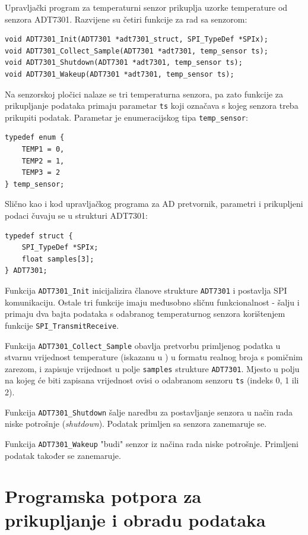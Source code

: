 Upravljački program za temperaturni senzor prikuplja uzorke temperature od senzora ADT7301. Razvijene su četiri funkcije za rad sa senzorom:

\begin{lstlisting}
void ADT7301_Init(ADT7301 *adt7301_struct, SPI_TypeDef *SPIx);
void ADT7301_Collect_Sample(ADT7301 *adt7301, temp_sensor ts);
void ADT7301_Shutdown(ADT7301 *adt7301, temp_sensor ts);
void ADT7301_Wakeup(ADT7301 *adt7301, temp_sensor ts);
\end{lstlisting}

Na senzorskoj pločici nalaze se tri temperaturna senzora, pa zato funkcije za prikupljanje podataka primaju parametar \texttt{ts} koji označava s kojeg senzora treba prikupiti podatak. Parametar je enumeracijskog tipa \texttt{temp\_sensor}:

\begin{lstlisting}
typedef enum {
    TEMP1 = 0,
    TEMP2 = 1,
    TEMP3 = 2
} temp_sensor;
\end{lstlisting}

Slično kao i kod upravljačkog programa za AD pretvornik, parametri i prikupljeni podaci čuvaju se u strukturi ADT7301:

\begin{lstlisting}
typedef struct {
	SPI_TypeDef *SPIx;
	float samples[3];
} ADT7301;
\end{lstlisting}

Funkcija \texttt{ADT7301\_Init} inicijalizira članove strukture \texttt{ADT7301} i postavlja SPI komunikaciju. Ostale tri funkcije imaju međusobno sličnu funkcionalnost - šalju i primaju dva bajta podataka s odabranog temperaturnog senzora korištenjem funkcije \texttt{SPI\_TransmitReceive}. 

Funkcija \texttt{ADT7301\_Collect\_Sample} obavlja pretvorbu primljenog podatka u stvarnu vrijednost temperature (iskazanu u \textcelsius{}) u formatu realnog broja s pomičnim zarezom, i zapisuje vrijednost u polje \texttt{samples} strukture \texttt{ADT7301}. Mjesto u polju na kojeg će biti zapisana vrijednost ovisi o odabranom senzoru \texttt{ts} (indeks 0, 1 ili 2).

Funkcija \texttt{ADT7301\_Shutdown} šalje naredbu za postavljanje senzora u način rada niske potrošnje (\textit{shutdown}). Podatak primljen sa senzora zanemaruje se.

Funkcija \texttt{ADT7301\_Wakeup} "budi" senzor iz načina rada niske potrošnje. Primljeni podatak također se zanemaruje.

\section{Programska potpora za prikupljanje i obradu podataka} \label{obrada}

